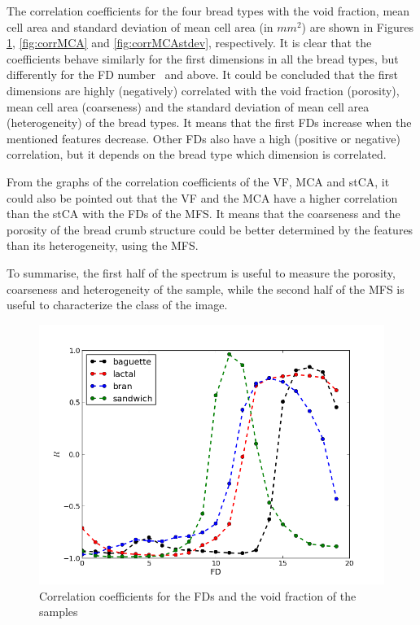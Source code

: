 The correlation coefficients for the four bread types with the void fraction, mean cell area and standard deviation of mean cell area (in $mm^{2}$) are shown in Figures \ref{fig:corrVF}, \ref{fig:corrMCA} and \ref{fig:corrMCAstdev}, respectively. It is clear that the coefficients behave similarly for the first dimensions in all the bread types, but differently for the FD number \ and above. It could be concluded that the first dimensions are highly (negatively) correlated with the void fraction (porosity), mean cell area (coarseness) and the standard deviation of mean cell area (heterogeneity) of the bread types. It means that the first FDs increase when the mentioned features decrease. Other FDs also have a high (positive or negative) correlation, but it depends on the bread type which dimension is correlated.

From the graphs of the correlation coefficients of the VF, MCA and stCA, it could also be pointed out that the VF and the MCA have a higher correlation than the stCA with the FDs of the MFS. It means that the coarseness and the porosity of the bread crumb structure could be better determined by the features than its heterogeneity, using the MFS.

To summarise, the first half of the spectrum is useful to measure the porosity, coarseness and heterogeneity of the sample, while the second half of the MFS is useful to characterize the class of the image.



\begin{figure}[htb]
\centering
\includegraphics[scale=0.4]{../images/vf}
\caption{Correlation coefficients for the FDs and the void fraction of the samples}
\label{fig:corrVF}
\end{figure}

